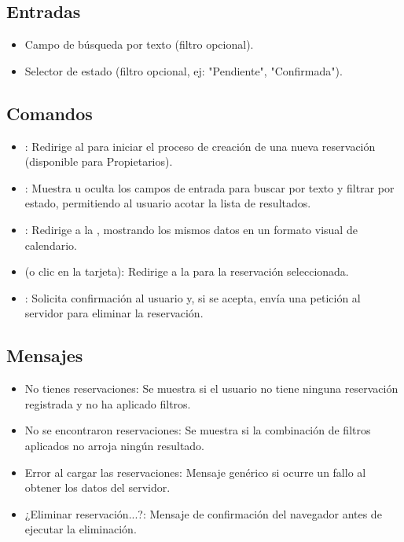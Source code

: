 \subsection{Entradas}
\begin{itemize}
    \item Campo de búsqueda por texto (filtro opcional).
    \item Selector de estado (filtro opcional, ej: "Pendiente", "Confirmada").
\end{itemize}

\subsection{Comandos}
\begin{itemize}
    \item {}: Redirige al  para iniciar el proceso de creación de una nueva reservación (disponible para Propietarios).
    \item {}: Muestra u oculta los campos de entrada para buscar por texto y filtrar por estado, permitiendo al usuario acotar la lista de resultados.
    \item {}: Redirige a la , mostrando los mismos datos en un formato visual de calendario.
    \item {} (o clic en la tarjeta): Redirige a la  para la reservación seleccionada.
    \item {}: Solicita confirmación al usuario y, si se acepta, envía una petición al servidor para eliminar la reservación.
\end{itemize}

\subsection{Mensajes}
\begin{itemize}
    \item No tienes reservaciones: Se muestra si el usuario no tiene ninguna reservación registrada y no ha aplicado filtros.
    \item No se encontraron reservaciones: Se muestra si la combinación de filtros aplicados no arroja ningún resultado.
    \item Error al cargar las reservaciones: Mensaje genérico si ocurre un fallo al obtener los datos del servidor.
    \item ¿Eliminar reservación...?: Mensaje de confirmación del navegador antes de ejecutar la eliminación.
\end{itemize}
